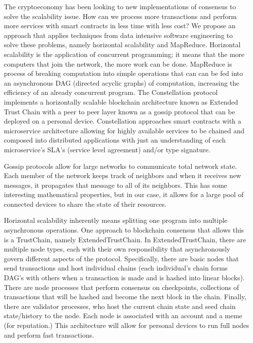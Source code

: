\documentclass{article}
\begin{document}
The cryptoeconomy has been looking to new implementations of consensus to solve the scalability issue. How can we process more transactions and perform more services with smart contracts in less time with less cost? We propose an approach that applies techniques from data intensive software engineering to solve these problems, namely horizontal scalability and MapReduce. Horizontal scalability is the application of concurrent programming; it means that the more computers that join the network, the more work can be done. MapReduce is process of breaking computation into simple operations that can can be fed into an asynchronous DAG (directed acyclic graphs) of computation, increasing the efficiency of an already concurrent program. The Constellation protocol implements a horizontally scalable blockchain architecture known as Extended Trust Chain with a peer to peer layer known as a gossip protocol that can be deployed on a personal device. Constellation approaches smart contracts with a microservice architecture allowing for highly available services to be chained and composed into distributed applications with just an understanding of each microservice's SLA's (service level agreement) and/or type signature.

Gossip protocols allow for large networks to communicate total network state. Each member of the network keeps track of neighbors and when it receives new messages, it propagates that message to all of its neighbors. This has some interesting mathematical properties, but in our case, it allows for a large pool of connected devices to share the state of their resources.

Horizontal scalability inherently means splitting one program into multiple asynchronous operations. One approach to blockchain consensus that allows this is a TrustChain, namely ExtendedTrustChain. In ExtendedTrustChain, there are multiple node types, each with their own responsibility that asynchronously govern different aspects of the protocol. Specifically, there are basic nodes that send transactions and host individual chains (each individual's chain forms DAG's with others when a transaction is made and is hashed into linear blocks). There are node processes that perform consensus on checkpoints, collections of transactions that will be hashed and become the next block in the chain. Finally, there are validator processes, who host the current chain state and seed chain state/history to the node. Each node is associated with an account and a meme (for reputation.) This architecture will allow for personal devices to run full nodes and perform fast transactions.
\end{document}

